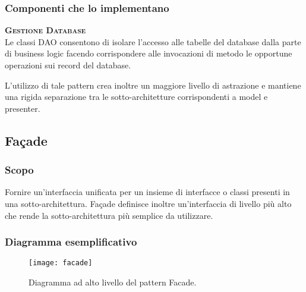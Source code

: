 \subsubsection{Componenti che lo implementano}
\begin{description}
\item{\scshape\bfseries Gestione Database}\\
Le classi DAO consentono di isolare l'accesso alle tabelle del database dalla parte di business logic facendo corrispondere alle invocazioni di metodo le opportune operazioni sui record del database.

L'utilizzo di tale pattern crea inoltre un maggiore livello di astrazione e mantiene una rigida separazione tra le sotto-architetture corrispondenti a model e presenter.
\end{description}

\subsection{Façade}

\subsubsection{Scopo}
Fornire un'interfaccia unificata per un insieme di interfacce o classi presenti in una sotto-architettura. Façade definisce inoltre un'interfaccia di livello più alto che rende la sotto-architettura più semplice da utilizzare.

\subsubsection{Diagramma esemplificativo}
\begin{figure}[h]
\centering
\texttt{[image: facade]}
\caption{Diagramma ad alto livello del pattern Facade.}\label{fig:facade}
\end{figure}


